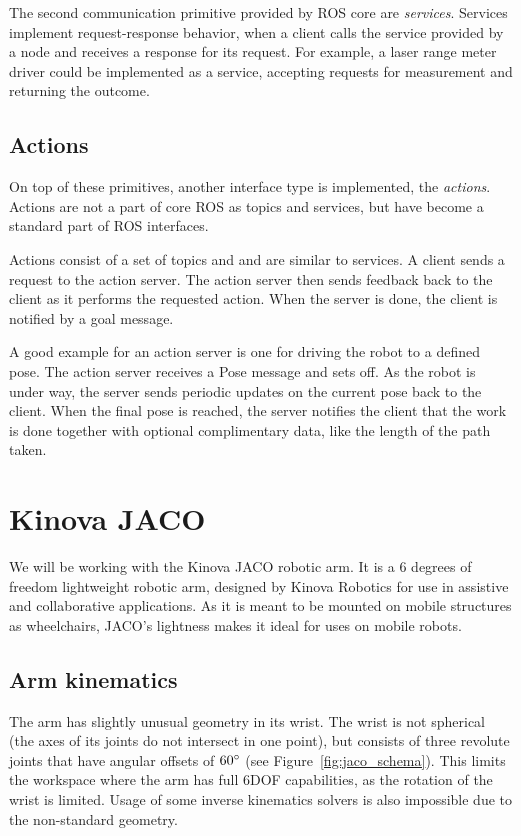 \documentclass[buriama8_dp.tex]{subfiles}
\begin{document}
The second communication primitive provided by ROS core are \emph{services}. Services implement request-response behavior, when a client calls the service provided by a node and receives a response for its request. For example, a laser range meter driver could be implemented as a service, accepting requests for measurement and returning the outcome.

\subsection{Actions}
\label{subsec:ros_actions}

On top of these primitives, another interface type is implemented, the \emph{actions}. Actions are not a part of core ROS as topics and services, but have become a standard part of ROS interfaces.

Actions consist of a set of topics and and are similar to services. A client sends a request to the action server. The action server then sends feedback back to the client as it performs the requested action. When the server is done, the client is notified by a goal message.

A good example for an action server is one for driving the robot to a defined pose. The action server receives a Pose message and sets off. As the robot is under way, the server sends periodic updates on the current pose back to the client. When the final pose is reached, the server notifies the client that the work is done together with optional complimentary data, like the length of the path taken.


\section{Kinova JACO}
\label{sec:jaco}
We will be working with the Kinova JACO robotic arm. It is a 6 degrees of freedom lightweight robotic arm, designed by Kinova Robotics for use in assistive and collaborative applications. As it is meant to be mounted on mobile structures as wheelchairs, JACO's lightness makes it ideal for uses on mobile robots.

\subsection{Arm kinematics}
\label{subsec:arm_kinematics}

The arm has slightly unusual geometry in its wrist. The wrist is not spherical (the axes of its joints do not intersect in one point), but consists of three revolute joints that have angular offsets of \(60^\circ\) (see Figure~\ref{fig:jaco_schema}). This limits the workspace where the arm has full 6DOF capabilities, as the rotation of the wrist is limited. Usage of some inverse kinematics solvers is also impossible due to the non-standard geometry.
\end{document}
